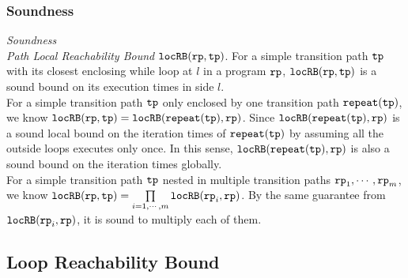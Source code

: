 \subsubsection{Soundness}
\emph{Soundness}
    \\
    \emph{Path Local Reachability Bound}  $\mathtt{locRB}(\mathtt{rp}, \mathtt{tp})$.
    For a simple transition path $\mathtt{tp}$ with its closest enclosing while loop at $l$ in a program $\mathtt{rp}$, 
    $\mathtt{locRB}(\mathtt{rp}, \mathtt{tp})$
    is a sound bound on its execution times in side $l$.
    \\
    For a simple transition path $\mathtt{tp}$ only enclosed by one transition path $\mathtt{repeat}(\mathtt{tp})$, 
    we know $\mathtt{locRB}(\mathtt{rp}, \mathtt{tp}) = \mathtt{locRB}(\mathtt{repeat}(\mathtt{tp}), \mathtt{rp})$.
    Since $\mathtt{locRB}(\mathtt{repeat}(\mathtt{tp}), \mathtt{rp})$ is a sound local bound on the iteration times
    of $\mathtt{repeat}(\mathtt{tp})$ by assuming all the outside loops executes only once.
    In this sense, $\mathtt{locRB}(\mathtt{repeat}(\mathtt{tp}), \mathtt{rp})$ is also a sound bound on the iteration times globally.
    \\
    For a simple transition path $\mathtt{tp}$ nested in multiple transition paths $\mathtt{rp}_1, \cdots, \mathtt{rp}_m$,
    we know $\mathtt{locRB}(\mathtt{rp}, \mathtt{tp}) = \prod\limits_{i = 1, \cdots, m}\mathtt{locRB}(\mathtt{rp}_i, \mathtt{rp})$.
    By the same guarantee from $\mathtt{locRB}(\mathtt{rp}_i, \mathtt{rp})$, it is sound to multiply each of them.
    


\subsection{Loop Reachability Bound}
